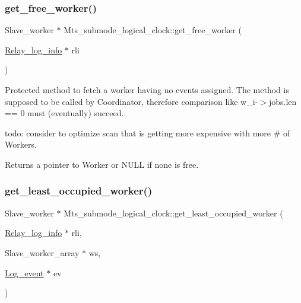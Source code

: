 \subsubsection{\texorpdfstring{get\+\_\+free\+\_\+worker()}{get\_free\_worker()}}
{\footnotesize\ttfamily Slave\+\_\+worker $\ast$ Mts\+\_\+submode\+\_\+logical\+\_\+clock\+::get\+\_\+free\+\_\+worker (\begin{DoxyParamCaption}\item[{\mbox{\hyperlink{classRelay__log__info}{Relay\+\_\+log\+\_\+info}} $\ast$}]{rli }\end{DoxyParamCaption})\hspace{0.3cm}{\ttfamily [protected]}}

Protected method to fetch a worker having no events assigned. The method is supposed to be called by Coordinator, therefore comparison like w\+\_\+i-\/$>$jobs.\+len == 0 must (eventually) succeed.

todo\+: consider to optimize scan that is getting more expensive with more \# of Workers.

\begin{DoxyReturn}{Returns}
a pointer to Worker or N\+U\+LL if none is free. 
\end{DoxyReturn}
\mbox{\label{classMts__submode__logical__clock_a2fcd334c4225b2cabdcd42a9e4179071}} 
\subsubsection{\texorpdfstring{get\+\_\+least\+\_\+occupied\+\_\+worker()}{get\_least\_occupied\_worker()}}
{\footnotesize\ttfamily Slave\+\_\+worker $\ast$ Mts\+\_\+submode\+\_\+logical\+\_\+clock\+::get\+\_\+least\+\_\+occupied\+\_\+worker (\begin{DoxyParamCaption}\item[{\mbox{\hyperlink{classRelay__log__info}{Relay\+\_\+log\+\_\+info}} $\ast$}]{rli,  }\item[{Slave\+\_\+worker\+\_\+array $\ast$}]{ws,  }\item[{\mbox{\hyperlink{classLog__event}{Log\+\_\+event}} $\ast$}]{ev }\end{DoxyParamCaption})\hspace{0.3cm}{\ttfamily [virtual]}}

